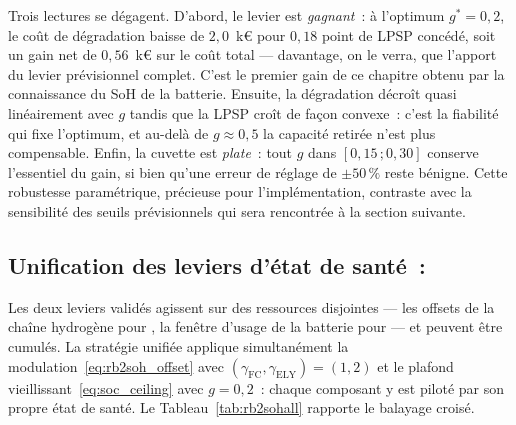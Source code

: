 Trois lectures se dégagent. D'abord, le levier est \emph{gagnant}~: à l'optimum $g^{*} = 0{,}2$, le coût de dégradation baisse de $2{,}0$~k€ pour $0{,}18$ point de LPSP concédé, soit un gain net de $0{,}56$~k€ sur le coût total — davantage, on le verra, que l'apport du levier prévisionnel complet. C'est le premier gain de ce chapitre obtenu par la connaissance du SoH de la batterie. Ensuite, la dégradation décroît quasi linéairement avec $g$ tandis que la LPSP croît de façon convexe~: c'est la fiabilité qui fixe l'optimum, et au-delà de $g \approx 0{,}5$ la capacité retirée n'est plus compensable. Enfin, la cuvette est \emph{plate}~: tout $g$ dans $[0{,}15\,; 0{,}30]$ conserve l'essentiel du gain, si bien qu'une erreur de réglage de $\pm 50\,\%$ reste bénigne. Cette robustesse paramétrique, précieuse pour l'implémentation, contraste avec la sensibilité des seuils prévisionnels qui sera rencontrée à la section suivante.

\subsection{Unification des leviers d'état de santé~: \RBsohA}
\label{subsec:rb2sohall}

Les deux leviers validés agissent sur des ressources disjointes — les offsets de la chaîne hydrogène pour \RBsohH, la fenêtre d'usage de la batterie pour \RBsohB{} — et peuvent être cumulés. La stratégie unifiée \RBsohA{} applique simultanément la modulation~\eqref{eq:rb2soh_offset} avec $(\gamma_{\text{FC}}, \gamma_{\text{ELY}}) = (1, 2)$ et le plafond vieillissant~\eqref{eq:soc_ceiling} avec $g = 0{,}2$~: chaque composant y est piloté par son propre état de santé. Le Tableau~\ref{tab:rb2sohall} rapporte le balayage croisé.

